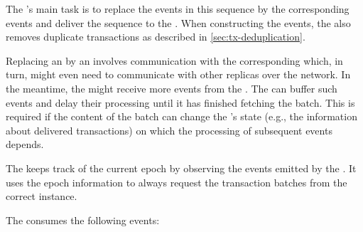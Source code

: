 \documentclass{article}
\begin{document}
The 's main task is to replace the  events in this sequence by the corresponding  events
and deliver the sequence to the .
When constructing the  events, the  also removes duplicate transactions as described in \cref{sec:tx-deduplication}.

Replacing an  by an  involves communication with the corresponding 
which, in turn, might even need to communicate with other replicas over the network.
In the meantime, the  might receive more events from the .
The  can buffer such events and delay their processing until it has finished fetching the batch.
This is required if the content of the batch can change the 's state (e.g., the information about delivered transactions)
on which the processing of subsequent events depends.

The  keeps track of the current epoch by observing the  events emitted by the .
It uses the epoch information to always request the transaction batches from the correct  instance.

The  consumes the following events:
\end{document}
